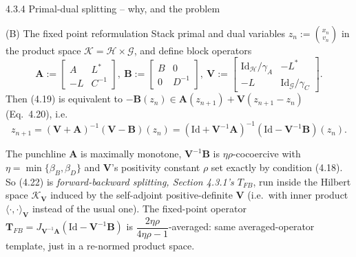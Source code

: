 \documentclass[aspectratio=169,10pt]{beamer}
\newcommand{\Id}{\mathrm{Id}}
\newcommand{\ip}[2]{\langle #1, #2\rangle}
\newcommand{\bv}[1]{\mathbf{#1}}
\begin{document}
\begin{frame}[allowframebreaks]{4.3.4 Primal-dual splitting -- why, and the problem}
  \begin{block}{(B) The fixed point reformulation}
    Stack primal and dual variables $z_n:=\binom{x_n}{v_n}$ in the product space $\mathcal K=\mathcal H\times\mathcal G$, and define block operators
    \begin{equation*}
      \bv{A} := \begin{bmatrix} A & L^* \\ -L & C^{-1} \end{bmatrix}\!, \
      \bv{B} := \begin{bmatrix} B & 0 \\ 0 & D^{-1} \end{bmatrix}\!, \
      \bv{V} := \begin{bmatrix} \Id_{\mathcal H}/\gamma_A & -L^* \\ -L & \Id_{\mathcal G}/\gamma_C \end{bmatrix}\!. \tag{4.21}
    \end{equation*}
    Then (4.19) is equivalent to $-\bv{B}(z_n)\in\bv{A}(z_{n+1})+\bv{V}(z_{n+1}-z_n)$ (Eq.\ 4.20), i.e.
    \begin{equation*}
      z_{n+1} = (\bv{V}+\bv{A})^{-1}(\bv{V}-\bv{B})(z_n) = (\Id+\bv{V}^{-1}\bv{A})^{-1}(\Id-\bv{V}^{-1}\bv{B})(z_n). \tag{4.22}
    \end{equation*}
  \end{block}
  \begin{block}{The punchline}
    $\bv{A}$ is maximally monotone, $\bv{V}^{-1}\bv{B}$ is $\eta\rho$-cocoercive with $\eta=\min\{\beta_B,\beta_D\}$ and $\bv{V}$'s positivity constant $\rho$ set exactly by condition (4.18). So (4.22) is \emph{forward-backward splitting, Section 4.3.1's $T_{FB}$}, run inside the Hilbert space $\mathcal K_{\bv V}$ induced by the self-adjoint positive-definite $\bv{V}$ (i.e.\ with inner product $\ip{\cdot}{\cdot}_{\bv V}$ instead of the usual one). The fixed-point operator $\bv{T}_{FB}=J_{\bv{V}^{-1}\bv{A}}(\Id-\bv{V}^{-1}\bv{B})$ is $\dfrac{2\eta\rho}{4\eta\rho-1}$-averaged: same averaged-operator template, just in a re-normed product space.
  \end{block}
\end{frame}
\end{document}

